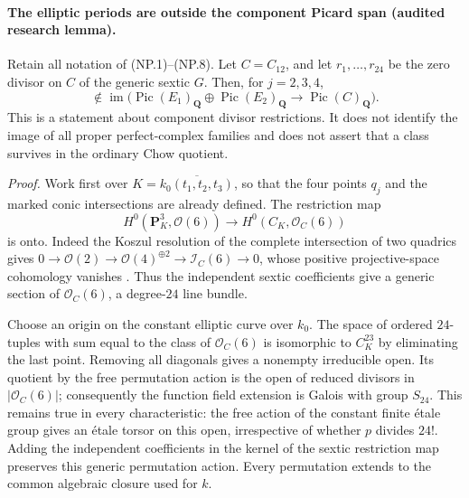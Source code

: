 \paragraph{The elliptic periods are outside the component Picard span
(audited research lemma).}
Retain all notation of (NP.1)--(NP.8). Let $C=C_{12}$, and let
$r_1,\ldots,r_{24}$ be the zero divisor on $C$ of the generic sextic $G$.
Then, for $j=2,3,4$,
\begin{equation}
 [q_j-q_1]\notin\operatorname{im}\bigl(
 \operatorname{Pic}(E_1)_{\mathbf Q}\oplus
 \operatorname{Pic}(E_2)_{\mathbf Q}\longrightarrow
 \operatorname{Pic}(C)_{\mathbf Q}\bigr).
                                                        \tag{NP.9}
\end{equation}
This is a statement about component divisor restrictions. It does
not identify the image of all proper perfect-complex families and
does not assert that a class survives in the ordinary Chow quotient.

\emph{Proof.}
Work first over $K=\overline{k_0(t_1,t_2,t_3)}$, so that the four
points $q_j$ and the marked conic intersections are already defined.
The restriction map
\[
 H^0(\mathbf P^3_K,\mathcal O(6))\longrightarrow
 H^0(C_K,\mathcal O_C(6))
\]
is onto. Indeed the Koszul resolution of the complete intersection
of two quadrics gives
$0\to\mathcal O(2)\to\mathcal O(4)^{\oplus2}\to
\mathcal I_C(6)\to0$, whose positive projective-space cohomology
vanishes \citep[Lemma 30.8.1 and complete proof]{frPrimitiveProjectiveCohomology}. Thus the independent sextic coefficients give a generic
section of $\mathcal O_C(6)$, a degree-$24$ line bundle.

Choose an origin on the constant elliptic curve over $k_0$.
The space of ordered $24$-tuples with sum equal to the class of
$\mathcal O_C(6)$ is isomorphic to $C_K^{23}$ by eliminating the
last point. Removing all diagonals gives a nonempty irreducible
open. Its quotient by the free permutation action is the open of
reduced divisors in $|\mathcal O_C(6)|$; consequently the function
field extension is Galois with group $S_{24}$. This remains true
in every characteristic: the free action of the constant finite
étale group gives an étale torsor on this open, irrespective of
whether $p$ divides $24!$. Adding the independent coefficients in
the kernel of the sextic restriction map preserves this generic
permutation action. Every permutation extends to the common
algebraic closure used for $k$.


